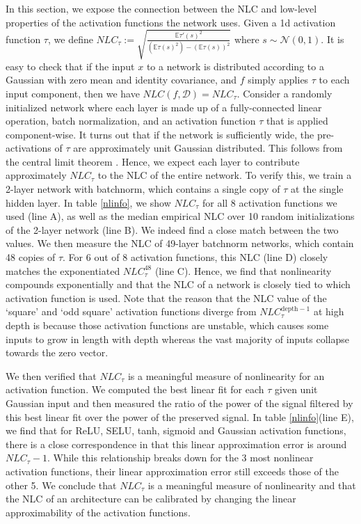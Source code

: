 \documentclass{article} %
\begin{document}
In this section, we expose the connection between the NLC and low-level properties of the activation functions the network uses. Given a 1d activation function $\tau$, we define $NLC_\tau := \sqrt{\frac{\mathbb{E}\tau'(s)^2}{(\mathbb{E}\tau(s)^2) -(\mathbb{E}\tau(s))^2}}$ where $s \sim \mathcal{N}(0,1)$. It is easy to check that if the input $x$ to a network is distributed according to a Gaussian with zero mean and identity covariance, and $f$ simply applies $\tau$ to each input component, then we have $NLC(f,\mathcal{D}) = NLC_\tau$. Consider a randomly initialized network where each layer is made up of a fully-connected linear operation, batch normalization, and an activation function $\tau$ that is applied component-wise. It turns out that if the network is sufficiently wide, the pre-activations of $\tau$ are approximately unit Gaussian distributed. This follows from the central limit theorem \citep{correlationLimit}. Hence, we expect each layer to contribute approximately $NLC_\tau$ to the NLC of the entire network. To verify this, we train a 2-layer network with batchnorm, which contains a single copy of $\tau$ at the single hidden layer. In table \ref{nlinfo}, we show $NLC_\tau$ for all 8 activation functions we used (line A), as well as the median empirical NLC over 10 random initializations of the 2-layer network (line B). We indeed find a close match between the two values. We then measure the NLC of 49-layer batchnorm networks, which contain 48 copies of $\tau$. For 6 out of 8 activation functions, this NLC (line D) closely matches the exponentiated $NLC_\tau^{48}$ (line C). Hence, we find that nonlinearity compounds exponentially and that the NLC of a network is closely tied to which activation function is used. Note that the reason that the NLC value of the `square' and `odd square' activation functions diverge from $NLC_\tau^{\text{depth}-1}$ at high depth is because those activation functions are unstable, which causes some inputs to grow in length with depth whereas the vast majority of inputs collapse towards the zero vector. 


We then verified that $NLC_\tau$ is a meaningful measure of nonlinearity for an activation function. We computed the best linear fit for each $\tau$ given unit Gaussian input and then measured the ratio of the power of the signal filtered by this best linear fit over the power of the preserved signal. In table \ref{nlinfo}(line E), we find that for ReLU, SELU, tanh, sigmoid and Gaussian activation functions, there is a close correspondence in that this linear approximation error is around $NLC_\tau - 1$. While this relationship breaks down for the 3 most nonlinear activation functions, their linear approximation error still exceeds those of the other 5. We conclude that $NLC_\tau$ is a meaningful measure of nonlinearity and that the NLC of an architecture can be calibrated by changing the linear approximability of the activation functions. 
\end{document}
